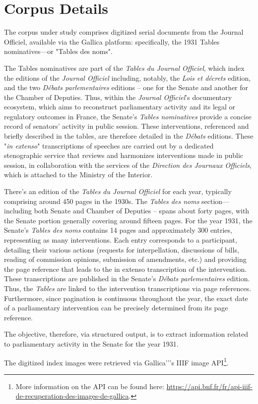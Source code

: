 \section{Corpus Details}
\label{appdx:corpora-details}


The corpus under study comprises digitized serial documents from the Journal Officiel, available via the Gallica platform: specifically, the 1931 Tables nominatives—or "Tables des noms".

The Tables nominatives are part of the \textit{Tables du Journal Officiel}, which index the editions of the \textit{Journal Officiel} including, notably, the \textit{Lois et décrets} edition, and the two \textit{Débats parlementaires} editions -- one for the Senate and another for the Chamber of Deputies. Thus, within the \textit{Journal Officiel}'s documentary ecosystem, which aims to reconstruct parliamentary activity and its legal or regulatory outcomes in France, the Senate's \textit{Tables nominatives} provide a concise record of senators' activity in public session. These interventions, referenced and briefly described in the tables, are therefore detailed in the \textit{Débats} editions. These "\textit{in extenso}" transcriptions of speeches are carried out by a dedicated stenographic service that reviews and harmonizes interventions made in public session, in collaboration with the services of the \textit{Direction des Journaux Officiels}, which is attached to the Ministry of the Interior.

There's an edition of the \textit{Tables du Journal Officiel} for each year, typically comprising around 450 pages in the 1930s. The \textit{Tables des noms} section—including both Senate and Chamber of Deputies -- spans about forty pages, with the Senate portion generally covering around fifteen pages. For the year 1931, the Senate's \textit{Tables des noms} contains 14 pages and approximately 300 entries, representing as many interventions. Each entry corresponds to a participant, detailing their various actions (requests for interpellation, discussions of bills, reading of commission opinions, submission of amendments, etc.) and providing the page reference that leads to the in extenso transcription of the intervention. These transcriptions are published in the Senate's \textit{Débats parlementaires} edition. Thus, the \textit{Tables} are linked to the intervention transcriptions via page references. Furthermore, since pagination is continuous throughout the year, the exact date of a parliamentary intervention can be precisely determined from its page reference.

The objective, therefore, via structured output, is to extract information related to parliamentary activity in the Senate for the year 1931. 

The digitized index images were retrieved via Gallica'’'s IIIF image API\footnote{More information on the API can be found here: \url{https://api.bnf.fr/fr/api-iiif-de-recuperation-des-images-de-gallica}.}.
